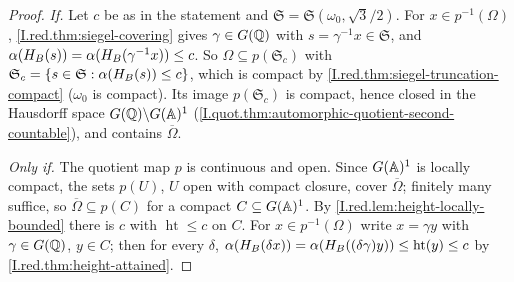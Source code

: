 \begin{theorem}
\end{theorem}
\begin{proof}
\emph{If.} Let $c$ be as in the statement and $\mathfrak S=\mathfrak S(\omega_0,\sqrt3/2)$. For $x\in p^{-1}(\Omega)$, \cref{I.red.thm:siegel-covering} gives
$\gamma\in G(\mathbb{Q})$ with $s=\gamma^{-1}x\in\mathfrak S$, and $\alpha(H_B(s))=\alpha(H_B(\gamma^{-1}x))\le c$. So $\Omega\subseteq p(\mathfrak S_c)$ with
$\mathfrak S_c=\{s\in\mathfrak S:\alpha(H_B(s))\le c\}$, which is compact by \cref{I.red.thm:siegel-truncation-compact} ($\omega_0$ is compact). Its image
$p(\mathfrak S_c)$ is compact, hence closed in the Hausdorff space $G(\mathbb{Q})\backslash G(\mathbb{A})^1$
(\cref{I.quot.thm:automorphic-quotient-second-countable}), and contains $\overline\Omega$.

\emph{Only if.} The quotient map $p$ is continuous and open. Since $G(\mathbb{A})^1$ is locally compact, the sets $p(U)$, $U$ open with compact
closure, cover $\overline\Omega$; finitely many suffice, so $\overline\Omega\subseteq p(C)$ for a compact $C\subseteq G(\mathbb{A})^1$. By
\cref{I.red.lem:height-locally-bounded} there is $c$ with $\operatorname{ht}\le c$ on $C$. For $x\in p^{-1}(\Omega)$ write $x=\gamma y$ with
$\gamma\in G(\mathbb{Q})$, $y\in C$; then for every $\delta$, $\alpha(H_B(\delta x))=\alpha(H_B((\delta\gamma)y))\le\operatorname{ht}(y)\le c$ by
\cref{I.red.thm:height-attained}.
\end{proof}

